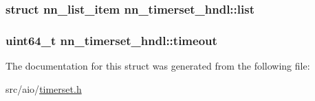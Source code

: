 \subsubsection[{list}]{\setlength{\rightskip}{0pt plus 5cm}struct {\bf nn\+\_\+list\+\_\+item} nn\+\_\+timerset\+\_\+hndl\+::list}\hypertarget{structnn__timerset__hndl_a4b4e5d70f265a22cfa8b5c38e0cf0d0d}{}\label{structnn__timerset__hndl_a4b4e5d70f265a22cfa8b5c38e0cf0d0d}
\subsubsection[{timeout}]{\setlength{\rightskip}{0pt plus 5cm}uint64\+\_\+t nn\+\_\+timerset\+\_\+hndl\+::timeout}\hypertarget{structnn__timerset__hndl_ae5926df4c2f56c572797528f602657da}{}\label{structnn__timerset__hndl_ae5926df4c2f56c572797528f602657da}


The documentation for this struct was generated from the following file\+:\begin{DoxyCompactItemize}
\item 
src/aio/\hyperlink{timerset_8h}{timerset.\+h}\end{DoxyCompactItemize}
